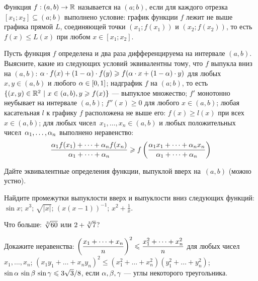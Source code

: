 \documentclass[a4paper,12pt]{article}
\def\dfrac{\displaystyle\frac}
\begin{document}




 Функция $f:(a,b)\rightarrow\mathbb{R}$
называется  на $(a;b)$, если для каждого отрезка
$[x_1;x_2]\subseteq(a;b)$ выполнено условие:
график функции $f$ лежит не выше графика прямой $L$,
соединяющей точки $(x_1;f(x_1))$ и $(x_2;f(x_2))$,
то есть $f(x)\le L(x)$ при любом $x\in[x_1;x_2]$.



 Пусть функция $f$ определена и два раза дифференцируема на
интервале $(a,b)$.  Выясните, какие из следующих условий
эквивалентны тому, что $f$ выпукла вниз на $(a,b)$:
$\alpha\cdot f(x)+(1-\alpha)\cdot f(y)\geqslant
f(\alpha\cdot x+(1-\alpha)\cdot y)$
для любых $x,y\in(a,b)$ и любого $\alpha\in[0,1]$;
надграфик $f$ на $(a;b)$,
то есть $\{(x,y)\in\R^2\ |\ x\in(a,b),y\geqslant f(x)\}$
--- выпуклое множество;
$f'$ монотонно неубывает на интервале $(a,b)$;
$f''(x)\geqslant0$ для любого $x\in(a,b)$;
любая касательная $l$ к графику $f$ расположена не выше его:
$f(x)\geqslant l(x)$ при всех $x\in(a,b)$;
для любых чисел~$x_1,\dots,x_n\in(a,b)$ и любых положительных чисел~$\alpha_1,\dots,\alpha_n$ выполнено неравенство:
\vspace*{-3mm}
$$
\dfrac{\al_1 f(x_1)+\dots+\al_n f(x_n)}{\al_1+\dots+\al_n}
\ge
f\hr{\dfrac{\al_1 x_1+\dots+\al_n x_n}{\al_1+\dots+\al_n}}
$$
\vspace*{-7mm}

 Дайте эквивалентные определения функции, выпуклой
вверх на~$(a,b)$ (можно устно).

 \label{funcs}
Найдите промежутки выпуклости вверх и выпуклости вниз
следующих функций:\\
 $\sin x$;
 $x^3$;
 $\sqrt{|x|}$;
 $(x(x-1))^{-1}$;
 $x^2+\frac1x$.

Что больше: $\root 3 \of{60}$ или $2+\root 3 \of 7$?

 Докажите %
неравенства:
$\hr{\dfrac{x_1+\dots+x_n}{n}}^2\le\dfrac{x_1^2+\dots+x_n^2}{n}$ для любых чисел $x_1,\dots,x_n$;
$(x_1y_1+\dots+x_ny_n)^2\le(x_1^2+\dots+x_n^2)(y_1^2+\dots+y_n^2)$;
$\sin \alpha \, \sin \beta\, \sin \gamma \leqslant 3\sqrt{3}/8$, если $\alpha,\beta,\gamma$ --- углы
некоторого треугольника.
\end{document}
